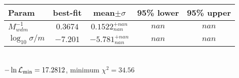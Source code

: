 \begin{tabular}{|l|c|c|c|c|} 
 \hline 
Param & best-fit & mean$\pm\sigma$ & 95\% lower & 95\% upper \\ \hline 
$M_{wdm}^{-1}$ &$0.3674$ & $0.1522_{nan}^{+nan}$ & $nan$ & $nan$ \\ 
$\log_{10}{\sigma / m}$ &$-7.201$ & $-5.781_{nan}^{+nan}$ & $nan$ & $nan$ \\ 
\hline 
 \end{tabular} \\ 
$-\ln{\cal L}_\mathrm{min} =17.2812$, minimum $\chi^2=34.56$ \\ 
